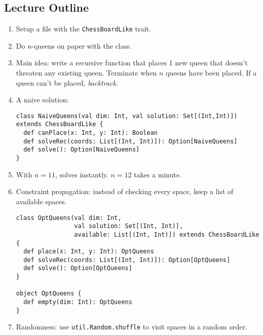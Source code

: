 \newlecture

\begin{instructor}
\section*{Lecture Outline}

\begin{enumerate}

  \item Setup a file with the \lstinline|ChessBoardLike| trait.

  \item Do $n$-queens on paper with the class.

  \item Main idea: write a recursive function that places 1 new queen that
  doesn't threaten any existing queen. Terminate when $n$ queens have been
  placed. If a queen can't be placed, \emph{backtrack}.

  \item A naive solution:

\begin{lstlisting}
class NaiveQueens(val dim: Int, val solution: Set[(Int,Int)]) extends ChessBoardLike {
  def canPlace(x: Int, y: Int): Boolean 
  def solveRec(coords: List[(Int, Int)]): Option[NaiveQueens]
  def solve(): Option[NaiveQueens]   
}
\end{lstlisting}

  \item With $n = 11$, solves instantly. $n = 12$ takes a minute.

  \item Constraint propagation: instead of checking every space, keep a list
  of available spaces.

\begin{lstlisting}
class OptQueens(val dim: Int, 
                val solution: Set[(Int, Int)], 
                available: List[(Int, Int)]) extends ChessBoardLike {
  def place(x: Int, y: Int): OptQueens
  def solveRec(coords: List[(Int, Int)]): Option[OptQueens]
  def solve(): Option[OptQueens]
}

object OptQueens {
  def empty(dim: Int): OptQueens
}  
\end{lstlisting}

  \item Randomness: use \lstinline|util.Random.shuffle| to visit spaces in a random
  order.

\end{enumerate}

\end{instructor}


